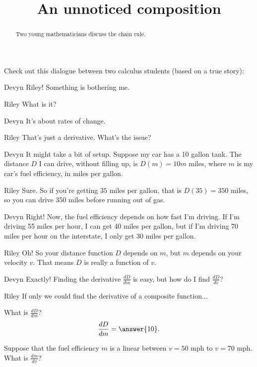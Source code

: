 \documentclass{ximera}
\title[Break-Ground:]{An unnoticed composition}
\begin{document}
\begin{abstract}
Two young mathematicians discuss the chain rule.
\end{abstract}
\maketitle

Check out this dialogue between two calculus students (based on a true
story):

\begin{dialogue}
\item[Devyn] Riley! Something is bothering me. 
\item[Riley] What is it?
\item[Devyn]  It's about rates of change.
\item[Riley] That's just a derivative.  What's the issue?
\item[Devyn]  It might take a bit of setup.  Suppose my car has a 10 gallon tank.  The distance $D$ I can drive, without filling up, is $D(m)=10m$ miles, where $m$ is my car's fuel
			efficiency, in miles per gallon.
\item[Riley]  Sure.  So if you're getting $35$ miles per gallon, that is $D(35) = 350$ miles, so you can drive 350 miles before running out of gas.
\item[Devyn] Right!  Now, the fuel efficiency depends on how fast I'm driving.  If I'm driving 55 miles per hour, I can get 40 miles per gallon, but if I'm driving 70 miles per hour on the interstate,
			I only get 30 miles per gallon.
\item[Riley]  Oh!  So your distance function $D$ depends on $m$, but $m$ depends on your velocity $v$.  That means $D$ is really a function of $v$.
\item[Devyn]  Exactly!  Finding the derivative $\frac{dD}{dm}$ is easy, but how do I find $\frac{dD}{dv}$?
\item[Riley]  If only we could find the derivative of a composite function...
\end{dialogue}



\begin{question}
	What is $\frac{dD}{dm}$?
	\[ \frac{dD}{dm} = \answer{10}. \]
\end{question}

\begin{question}
	Suppose that the fuel efficiency $m$ is a linear between $v = 50$ mph to $v= 70$ mph.  What is $\frac{dm}{dv}$?
	\begin{multipleChoice}
	\end{multipleChoice}
\end{question}

%
\end{document}
